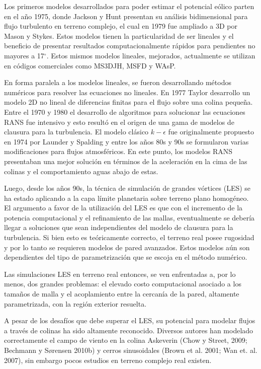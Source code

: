 Los primeros modelos desarrollados para poder estimar el potencial eólico parten en el año 1975, donde Jackson y Hunt presentan su análisis bidimensional para flujo turbulento en terreno complejo, el cual en 1979 fue ampliado a 3D por Mason y Stykes. Estos modelos tienen la particularidad de ser lineales y el beneficio de presentar resultados computacionalmente rápidos para pendientes no mayores a 17$^\circ$. Estos mismos modelos lineales, mejorados, actualmente se utilizan en códigos comerciales como MS3DJH, MSFD y WAsP.

En forma paralela a los modelos lineales, se fueron desarrollando métodos numéricos para resolver las ecuaciones no lineales. En 1977 Taylor desarrollo un modelo 2D no lineal de diferencias finitas para el flujo sobre una colina pequeña. Entre el 1970 y 1980 el desarrollo de algoritmos para solucionar las ecuaciones RANS fue intensivo y esto resultó en el origen de una gama de modelos de clausura para la turbulencia. El modelo clásico $k-\epsilon$ fue originalmente propuesto en 1974 por Launder y Spalding y entre los años 80s y 90s se formularon varias modificaciones para flujos atmosféricos. En este punto, los modelos RANS presentaban una mejor solución en términos de la aceleración en la cima de las colinas y el comportamiento aguas abajo de estas.

Luego, desde los años 90s, la técnica de simulación de grandes vórtices (LES) se ha estado aplicando a la capa límite planetaria sobre terreno plano homogéneo. El argumento a favor de la utilización del LES es que con el incremento de la potencia computacional y el refinamiento de las mallas, eventualmente se debería llegar a soluciones que sean independientes del modelo de clausura para la turbulencia. Si bien esto es teóricamente correcto, el terreno real posee rugosidad y por lo tanto se requieren modelos de pared avanzados. Estos modelos aún son dependientes del tipo de parametrización que se escoja en el método numérico.

Las simulaciones LES en terreno real entonces, se ven enfrentadas a, por lo menos, dos grandes problemas: el elevado costo computacional asociado a los tamaños de malla y el acoplamiento entre la cercanía de la pared, altamente parametrizada, con la región exterior resuelta.

A pesar de los desafíos que debe superar el LES, su potencial para modelar flujos a través de colinas ha sido altamente reconocido. Diversos autores han modelado correctamente el campo de viento en la colina Askeverin (Chow y Street, 2009; Bechmann y Sørensen 2010b) y cerros sinusoidales (Brown et al. 2001; Wan et. al. 2007), sin embargo pocos estudios en terreno complejo real existen.

